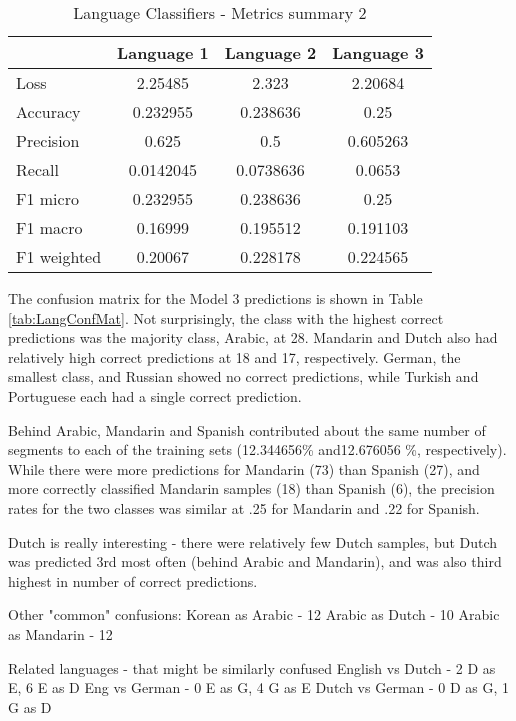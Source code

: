 \documentclass[11pt, letterpaper]{article}
\begin{document}
\begin{table}[h]
\begin{center}
\caption{Language Classifiers - Metrics summary 2}
\begin{tabular}{l c c c}
		&Language 1	&Language 2	&Language 3 \\ \hline
Loss		&2.25485		&2.323		&2.20684 \\
Accuracy	&0.232955	&0.238636	&0.25\\
Precision	&0.625		&0.5			&0.605263\\
Recall	&0.0142045	&0.0738636	&0.0653 \\  \hline
F1 micro	&0.232955	&0.238636	&0.25\\
F1 macro	&0.16999		&0.195512	&0.191103\\
F1 weighted	&0.20067	&0.228178	&0.224565\\
\end{tabular}
\label{tab:LangMetricsSum2} 
\end{center}
\end{table} 

The confusion matrix for the Model 3 predictions is shown in Table \ref{tab:LangConfMat}. Not surprisingly, the class with the highest correct predictions was the majority class, Arabic, at 28. Mandarin and Dutch also had relatively high correct predictions at 18 and 17, respectively. German, the smallest class, and Russian showed no correct predictions, while Turkish and Portuguese each had a single correct prediction.

Behind Arabic, Mandarin and Spanish contributed about the same number of segments to each of the training sets (12.344656\% and12.676056 \%, respectively). While there were more predictions for Mandarin (73) than Spanish (27), and more correctly classified Mandarin samples (18) than Spanish (6), the precision rates for the two classes was similar at .25 for Mandarin and .22 for Spanish.

Dutch is really interesting - there were relatively few Dutch samples, but Dutch was predicted 3rd most often (behind Arabic and Mandarin), and was also third highest in number of correct predictions.

Other "common" confusions:
Korean as Arabic - 12
Arabic as Dutch - 10
Arabic as Mandarin - 12

Related languages -  that might be similarly confused
English vs Dutch - 2 D as E, 6 E as D
Eng vs German - 0 E as G, 4 G as E
Dutch vs German - 0 D as G, 1 G as D
\end{document}

